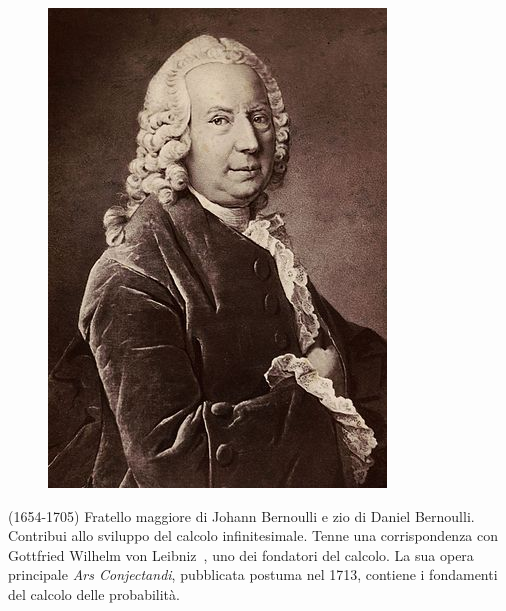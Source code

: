 \begin{figure}
	\centering{}
	\label{fig:339px-eth-bib-bernoullidaniel1700-1782-portrait-portr10971}
	\includegraphics[width=0.7\linewidth]{Figure/B/Bernoulli_Daniel}
\end{figure}
(1654-1705) Fratello maggiore di Johann Bernoulli e zio di Daniel Bernoulli. Contribui allo sviluppo del calcolo infinitesimale. Tenne una corrispondenza con Gottfried Wilhelm von Leibniz\pointsto~, uno dei fondatori del calcolo. La sua opera principale \textit{Ars Conjectandi}, pubblicata postuma nel 1713, contiene i fondamenti del calcolo delle probabilità.
